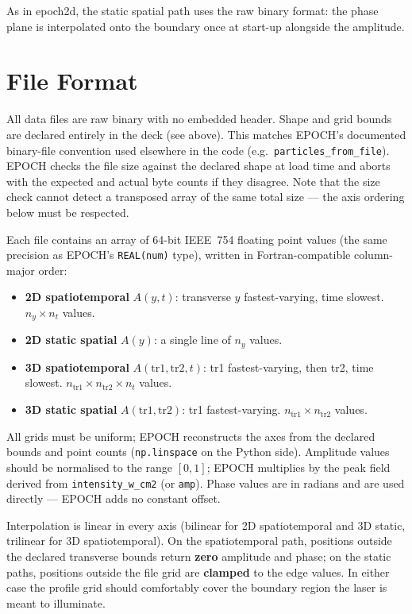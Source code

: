 \documentclass[11pt,a4paper]{article}
\begin{document}
As in epoch2d, the static spatial path uses the raw binary format: the phase plane is
interpolated onto the boundary once at start-up alongside the amplitude.

\section{File Format}

All data files are raw binary with no embedded header. Shape and grid
bounds are declared entirely in the deck (see above). This matches
EPOCH's documented binary-file convention used elsewhere in the code
(e.g.\ \texttt{particles\_from\_file}). EPOCH checks the file size
against the declared shape at load time and aborts with the expected and
actual byte counts if they disagree. Note that the size check cannot
detect a transposed array of the same total size --- the axis ordering
below must be respected.

Each file contains an array of 64-bit IEEE~754 floating point values (the
same precision as EPOCH's \texttt{REAL(num)} type), written in
Fortran-compatible column-major order:

\begin{itemize}
  \item \textbf{2D spatiotemporal} $A(y, t)$: transverse $y$
    fastest-varying, time slowest. $n_y \times n_t$ values.
  \item \textbf{2D static spatial} $A(y)$: a single line of $n_y$ values.
  \item \textbf{3D spatiotemporal} $A(\mathrm{tr1}, \mathrm{tr2}, t)$:
    tr1 fastest-varying, then tr2, time slowest.
    $n_{\mathrm{tr1}} \times n_{\mathrm{tr2}} \times n_t$ values.
  \item \textbf{3D static spatial} $A(\mathrm{tr1}, \mathrm{tr2})$: tr1
    fastest-varying. $n_{\mathrm{tr1}} \times n_{\mathrm{tr2}}$ values.
\end{itemize}

All grids must be uniform; EPOCH reconstructs the axes from the declared
bounds and point counts (\texttt{np.linspace} on the Python side).
Amplitude values should be normalised to the range $[0, 1]$; EPOCH
multiplies by the peak field derived from \texttt{intensity\_w\_cm2} (or
\texttt{amp}). Phase values are in radians and are used directly ---
EPOCH adds no constant offset.

Interpolation is linear in every axis (bilinear for 2D spatiotemporal and
3D static, trilinear for 3D spatiotemporal). On the spatiotemporal path,
positions outside the declared transverse bounds return \textbf{zero}
amplitude and phase; on the static paths, positions outside the file grid
are \textbf{clamped} to the edge values. In either case the profile grid
should comfortably cover the boundary region the laser is meant to
illuminate.
\end{document}
